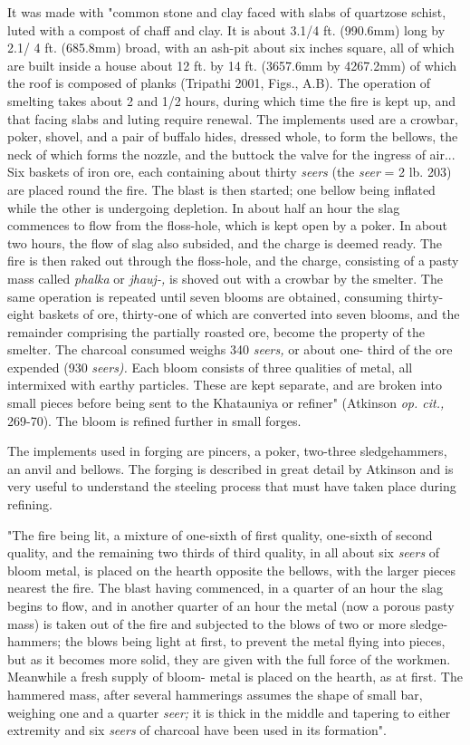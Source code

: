 It was made with "common stone and clay faced with slabs of quartzose schist, luted with a compost of chaff and clay. It is about 3.1/4 ft. (990.6mm) long by 2.1/ 4 ft. (685.8mm) broad, with an ash-pit about six inches square, all of which are built inside a house about 12 ft. by 14 ft. (3657.6mm by 4267.2mm) of which the roof is composed of planks (Tripathi 2001, Figs., A.B). The operation of smelting takes about 2 and 1/2 hours, during which time the fire is kept up, and that facing slabs and luting require renewal. The implements used are a crowbar, poker, shovel, and a pair of buffalo hides, dressed whole, to form the bellows, the neck of which forms the nozzle, and the buttock the valve for the ingress of air... Six baskets of iron ore, each containing about thirty \textit{seers }(the \textit{seer }= 2 lb. 203) are placed round the fire. The blast is then started; one bellow being inflated while the other is undergoing depletion. In about half an hour the slag commences to flow from the floss-hole, which is kept open by a poker. In about two hours, the flow of slag also subsided, and the charge is deemed ready. The fire is then raked out through the floss-hole, and the charge, consisting of a pasty mass called \textit{phalka }or \textit{jhauj-, }is shoved out with a crowbar by the smelter. The same operation is repeated until seven blooms are obtained, consuming thirty-eight baskets of ore, thirty-one of which are converted into seven blooms, and the remainder comprising the partially roasted ore, become the property of the smelter. The charcoal consumed weighs 340 \textit{seers, }or about one- third of the ore expended (930 \textit{seers). }Each bloom consists of three qualities of metal, all intermixed with earthy particles. These are kept separate, and are broken into small pieces before being sent to the Khatauniya or refiner" (Atkinson \textit{op. cit., }269-70). The bloom is refined further in small forges.

The implements used in forging are pincers, a poker, two-three sledgehammers, an anvil and bellows. The forging is described in great detail by Atkinson and is very useful to understand the steeling process that must have taken place during refining.

"The fire being lit, a mixture of one-sixth of first quality, one-sixth of second quality, and the remaining two ­thirds of third quality, in all about six \textit{seers }of bloom metal, is placed on the hearth opposite the bellows, with the larger pieces nearest the fire. The blast having commenced, in a quarter of an hour the slag begins to flow, and in another quarter of an hour the metal (now a porous pasty mass) is taken out of the fire and subjected to the blows of two or more sledge-hammers; the blows being light at first, to prevent the metal flying into pieces, but as it becomes more solid, they are given with the full force of the workmen. Meanwhile a fresh supply of bloom­- metal is placed on the hearth, as at first. The hammered mass, after several hammerings assumes the shape of small bar, weighing one and a quarter \textit{seer; }it is thick in the middle and tapering to either extremity and six \textit{seers} of charcoal have been used in its formation".

